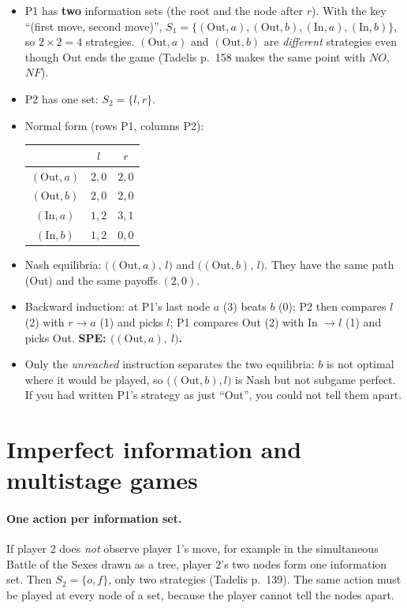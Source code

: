 \documentclass[11pt,a4paper]{article}
\begin{document}
\begin{itemize}
\item P1 has \textbf{two} information sets (the root and the node after $r$). With the key ``(first
move, second move)'', $S_1=\{(\text{Out},a),(\text{Out},b),(\text{In},a),(\text{In},b)\}$, so
$2\times2=4$ strategies. $(\text{Out},a)$ and $(\text{Out},b)$ are \emph{different} strategies even
though Out ends the game (Tadelis p.~158 makes the same point with $NO$, $NF$).
\item P2 has one set: $S_2=\{l,r\}$.
\item Normal form (rows P1, columns P2):
\begin{center}\small
\begin{tabular}{c|cc}
 & $l$ & $r$\\\hline
$(\text{Out},a)$ & $2,0$ & $2,0$\\
$(\text{Out},b)$ & $2,0$ & $2,0$\\
$(\text{In},a)$ & $1,2$ & $3,1$\\
$(\text{In},b)$ & $1,2$ & $0,0$
\end{tabular}
\end{center}
\item Nash equilibria: $\big((\text{Out},a),\,l\big)$ and $\big((\text{Out},b),\,l\big)$. They have
the same path (Out) and the same payoffs $(2,0)$.
\item Backward induction: at P1's last node $a$ (3) beats $b$ (0); P2 then compares $l$ (2) with
$r\to a$ (1) and picks $l$; P1 compares Out (2) with In $\to l$ (1) and picks Out.
\textbf{SPE: $\big((\text{Out},a),\ l\big)$.}
\item Only the \emph{unreached} instruction separates the two equilibria: $b$ is not optimal
where it would be played, so $\big((\text{Out},b),l\big)$ is Nash but not subgame perfect. If you
had written P1's strategy as just ``Out'', you could not tell them apart.
\end{itemize}

\section{Imperfect information and multistage games}

\paragraph{One action per information set.} If player 2 does \emph{not} observe player 1's move,
for example in the simultaneous Battle of the Sexes drawn as a tree, player 2's two nodes form one
information set. Then $S_2=\{o,f\}$, only two strategies (Tadelis p.~139). The same action must be
played at every node of a set, because the player cannot tell the nodes apart.
\end{document}
